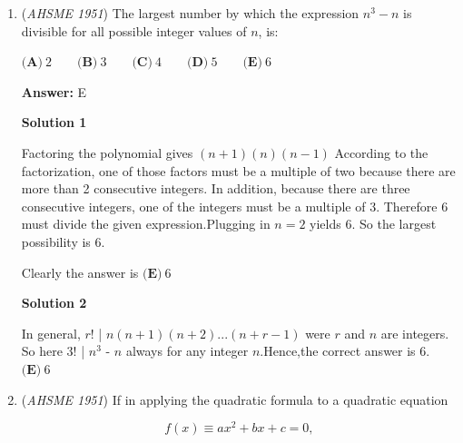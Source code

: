 \begin{enumerate}
\textbf{Solution}

$\boxed{\textbf{(C)}}$ is false, as in geometry, the undefined terms point, line, and plane exist.

 A is true, as in geometry, such statements (usually referred to as postulates or axioms) exist.

 B is true, as in geometry, statements may be independent of each other, so it does not matter which order they are proved in. 

 D is true, as if the given or hypothesis of a theorem is false, then that theorem cannot be used.

 E is true, as if two or more propositions are contrary, a proof by contradiction may be used to prove that not all of these propositions can be true.

 


	\item (\textit{AHSME 1951}) The largest number by which the expression $n^3-n$ is divisible for all possible integer values of $n$, is: 


 $\textbf{(A)}\ 2\qquad\textbf{(B)}\ 3\qquad\textbf{(C)}\ 4\qquad\textbf{(D)}\ 5\qquad\textbf{(E)}\ 6$

 \textbf{Answer: }E



\textbf{Solution 1}

Factoring the polynomial gives $(n+1)(n)(n-1)$ According to the factorization, one of those factors must be a multiple of two because there are more than 2 consecutive integers. In addition, because there are three consecutive integers, one of the integers must be a multiple of 3.  Therefore $6$ must divide the given expression.Plugging in $n=2$ yields $6$.  So the largest possibility is $6$.

 Clearly the answer is $\boxed{\textbf{(E)} \ 6}$




\textbf{Solution 2}

In general, $r!$ | $n(n+1)(n+2)...(n+r-1)$ were $r$ and $n$ are integers. So here $3!$ | $n^3$ - $n$ always for any integer $n$.Hence,the correct answer is $6$. $\boxed{\textbf{(E)} \ 6}$



	\item (\textit{AHSME 1951}) If in applying the quadratic formula to a quadratic equation


 
 \[f(x) \equiv ax^2 + bx + c = 0,\]



\end{enumerate}
